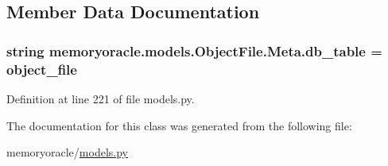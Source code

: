 \subsection{Member Data Documentation}
\hypertarget{classmemoryoracle_1_1models_1_1ObjectFile_1_1Meta_a3920ab6408e0c273a3a5d50ff02654c3}{}
\subsubsection[{db\+\_\+table}]{\setlength{\rightskip}{0pt plus 5cm}string memoryoracle.\+models.\+Object\+File.\+Meta.\+db\+\_\+table = \textquotesingle{}object\+\_\+file\textquotesingle{}\hspace{0.3cm}{\ttfamily [static]}}\label{classmemoryoracle_1_1models_1_1ObjectFile_1_1Meta_a3920ab6408e0c273a3a5d50ff02654c3}


Definition at line 221 of file models.\+py.



The documentation for this class was generated from the following file\+:\begin{DoxyCompactItemize}
\item 
memoryoracle/\hyperlink{models_8py}{models.\+py}\end{DoxyCompactItemize}
